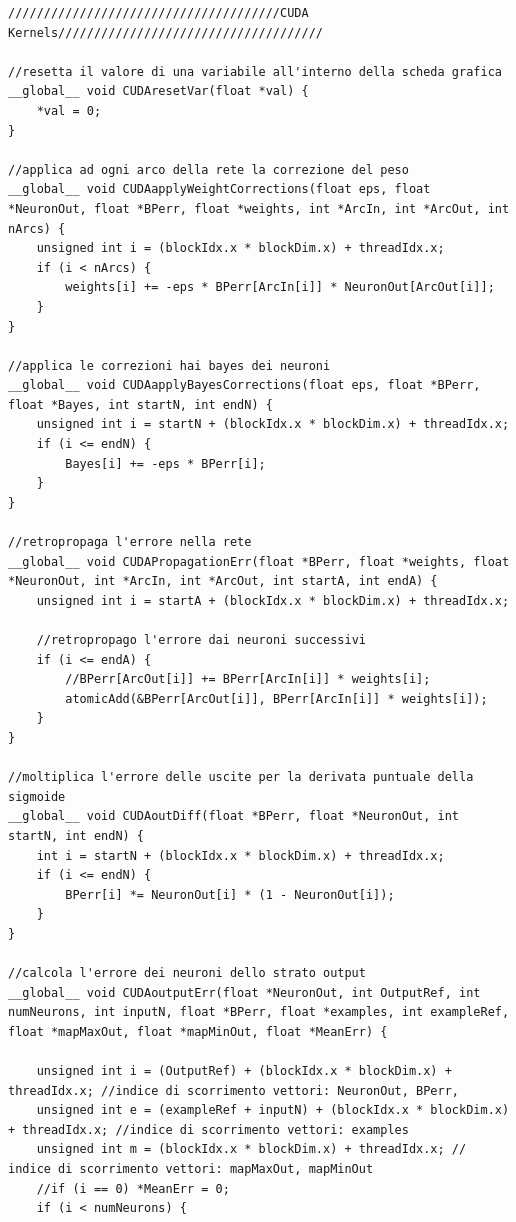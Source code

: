 \documentclass[10pt,a4paper]{article}
\begin{document}
\begin{lstlisting}[style=mycuda, caption=cuda kernels, captionpos=b]
//////////////////////////////////////CUDA Kernels/////////////////////////////////////

//resetta il valore di una variabile all'interno della scheda grafica
__global__ void CUDAresetVar(float *val) {
	*val = 0;
}

//applica ad ogni arco della rete la correzione del peso
__global__ void CUDAapplyWeightCorrections(float eps, float *NeuronOut, float *BPerr, float *weights, int *ArcIn, int *ArcOut, int nArcs) {
	unsigned int i = (blockIdx.x * blockDim.x) + threadIdx.x;
	if (i < nArcs) {
		weights[i] += -eps * BPerr[ArcIn[i]] * NeuronOut[ArcOut[i]];
	}
}

//applica le correzioni hai bayes dei neuroni
__global__ void CUDAapplyBayesCorrections(float eps, float *BPerr, float *Bayes, int startN, int endN) {
	unsigned int i = startN + (blockIdx.x * blockDim.x) + threadIdx.x;
	if (i <= endN) {
		Bayes[i] += -eps * BPerr[i];
	}
}

//retropropaga l'errore nella rete 
__global__ void CUDAPropagationErr(float *BPerr, float *weights, float *NeuronOut, int *ArcIn, int *ArcOut, int startA, int endA) {
	unsigned int i = startA + (blockIdx.x * blockDim.x) + threadIdx.x;

	//retropropago l'errore dai neuroni successivi
	if (i <= endA) {
		//BPerr[ArcOut[i]] += BPerr[ArcIn[i]] * weights[i];
		atomicAdd(&BPerr[ArcOut[i]], BPerr[ArcIn[i]] * weights[i]);
	}
}

//moltiplica l'errore delle uscite per la derivata puntuale della sigmoide
__global__ void CUDAoutDiff(float *BPerr, float *NeuronOut, int startN, int endN) {
	int i = startN + (blockIdx.x * blockDim.x) + threadIdx.x;
	if (i <= endN) {
		BPerr[i] *= NeuronOut[i] * (1 - NeuronOut[i]);
	}
}

//calcola l'errore dei neuroni dello strato output
__global__ void CUDAoutputErr(float *NeuronOut, int OutputRef, int numNeurons, int inputN, float *BPerr, float *examples, int exampleRef, float *mapMaxOut, float *mapMinOut, float *MeanErr) {

	unsigned int i = (OutputRef) + (blockIdx.x * blockDim.x) + threadIdx.x; //indice di scorrimento vettori: NeuronOut, BPerr, 
	unsigned int e = (exampleRef + inputN) + (blockIdx.x * blockDim.x) + threadIdx.x; //indice di scorrimento vettori: examples
	unsigned int m = (blockIdx.x * blockDim.x) + threadIdx.x; // indice di scorrimento vettori: mapMaxOut, mapMinOut
	//if (i == 0) *MeanErr = 0;
	if (i < numNeurons) {


\end{lstlisting}
\end{document}

